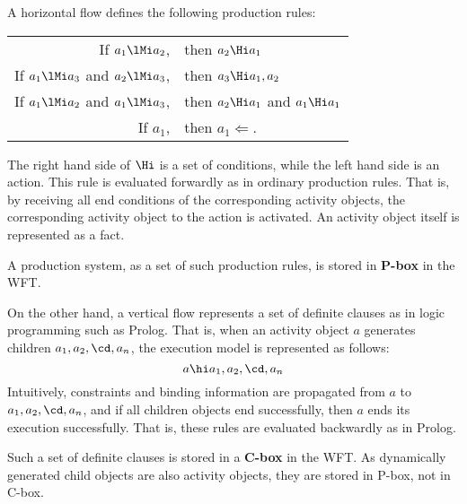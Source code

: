 A horizontal flow defines the following production rules:
\begin{center}
 \begin{tabular}{rl}
 If $a_1\lMi a_2$, &then $a_2\Hi a_1$\\
 If $a_1\lMi a_3$ and $a_2\lMi a_3$, &then $a_3\Hi a_1,a_2$\\
 If $a_1\lMi a_2$ and $a_1\lMi a_3$, &then $a_2\Hi a_1$ and $a_1\Hi
  a_1$\\
 If $a_1$, & then $a_1 \Leftarrow .$\\
 \end{tabular}
\end{center}
The right hand side of $\Hi$ is a set of conditions, while the left
hand side is an action.
This rule is evaluated forwardly as in ordinary production rules.
That is, by receiving all end conditions of the corresponding activity
objects, the corresponding activity object to the action is activated.
An activity object itself is represented as a fact.

A production system, as a set of such production rules, is stored in
{\bf P-box} in the WFT.

On the other hand, a vertical flow represents a set of definite clauses
as in logic programming such as Prolog.
That is, when an activity object $a$ generates children $a_1,a_2,\cd,a_n$,
the execution model is represented as follows:
\[a\hi a_1,a_2,\cd,a_n\]
Intuitively, constraints and binding information are propagated from $a$ 
to $a_1,a_2,\cd,a_n$, and if all children objects end successfully, then
$a$ ends its execution successfully.
That is, these rules are evaluated backwardly as in Prolog.

Such a set of definite clauses is stored in a {\bf C-box} in the WFT\@.
As dynamically generated child objects are also activity objects,
they are stored in P-box, not in C-box.

